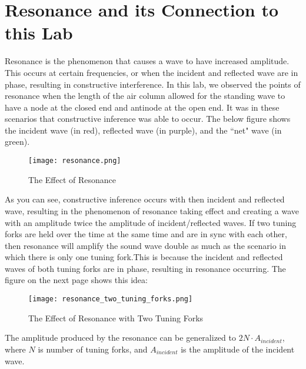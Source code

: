 \documentclass[11pt,twoside]{article}
\begin{document}
\section{Resonance and its Connection to this Lab}

Resonance is the phenomenon that causes a wave to have increased amplitude. This occurs at certain frequencies, or when the incident and reflected wave are in phase, resulting in constructive interference. In this lab, we observed the points of resonance when the length of the air column allowed for the standing wave to have a node at the closed end and antinode at the open end. It was in these scenarios that constructive inference was able to occur. The below figure shows the incident wave (in red), reflected wave (in purple), and the ``net" wave (in green).


\begin{wrapfigure}{l}{0.45\textwidth}
    \centering
    \texttt{[image: resonance.png]}
    \caption{The Effect of Resonance}
\end{wrapfigure}

As you can see, constructive inference occurs with then incident and reflected wave, resulting in the phenomenon of resonance taking effect and creating a wave with an amplitude twice the amplitude of incident/reflected waves. If two tuning forks are held over the time at the same time and are in sync with each other, then resonance will amplify the sound wave double as much as the scenario in which there is only one tuning fork.This is because the incident and reflected waves of both tuning forks are in phase, resulting in resonance occurring. The figure on the next page shows this idea:

\clearpage 

\begin{figure}
    \centering
    \texttt{[image: resonance\_two\_tuning\_forks.png]}
    \caption{The Effect of Resonance with Two Tuning Forks}
\end{figure} 

The amplitude produced by the resonance can be generalized to $2N \cdot A_{incident}$, where $N$ is number of tuning forks, and $A_{incident}$ is the amplitude of the incident wave. 
\end{document}
